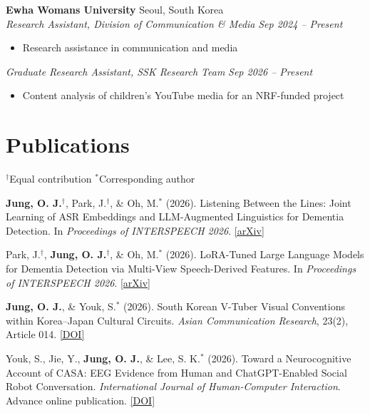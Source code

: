 \documentclass[11pt,a4paper]{article}
\newcommand{\Needspace}[1]{\par\ifdim\dimexpr\pagegoal-\pagetotal\relax<#1\relax\newpage\fi}
\newcommand{\cvrole}[2]{%
    \noindent\textit{#1} \hfill \textit{#2}%
}
\newcommand{\cvresearch}[4]{%
    \Needspace{6\baselineskip}\noindent\textbf{#1} \hfill #2 \\[3pt]
    \cvrole{#3}{#4}%
}
\begin{document}
\cvresearch{Ewha Womans University}{Seoul, South Korea}{Research Assistant, Division of Communication \& Media}{Sep 2024 -- Present}
\begin{itemize}[leftmargin=*, itemsep=3pt, topsep=6pt]
    \item Research assistance in communication and media
\end{itemize}
\vspace{6pt}

\cvrole{Graduate Research Assistant, SSK Research Team}{Sep 2026 -- Present}
\begin{itemize}[leftmargin=*, itemsep=3pt, topsep=6pt]
    \item Content analysis of children's YouTube media for an NRF-funded project
\end{itemize}

\section{Publications}
{\small $^{\dagger}$Equal contribution \quad $^{*}$Corresponding author}

\begin{enumerate}[leftmargin=*, label={[\arabic*]}, itemsep=2pt]
    \item\label{pub:listening} \textbf{Jung, O. J.}$^{\dagger}$, Park, J.$^{\dagger}$, \& Oh, M.$^{*}$ (2026). Listening Between the Lines: Joint Learning of ASR Embeddings and LLM-Augmented Linguistics for Dementia Detection. In \textit{Proceedings of INTERSPEECH 2026}. \href{https://arxiv.org/abs/2606.30675}{[arXiv]}

    \item\label{pub:lora} Park, J.$^{\dagger}$, \textbf{Jung, O. J.}$^{\dagger}$, \& Oh, M.$^{*}$ (2026). LoRA-Tuned Large Language Models for Dementia Detection via Multi-View Speech-Derived Features. In \textit{Proceedings of INTERSPEECH 2026}. \href{https://arxiv.org/abs/2606.28445}{[arXiv]}

    \item\label{pub:vtuber} \textbf{Jung, O. J.}, \& Youk, S.$^{*}$ (2026). South Korean V-Tuber Visual Conventions within Korea--Japan Cultural Circuits. \textit{Asian Communication Research}, 23(2), Article 014. \href{https://doi.org/10.20879/acr.2026.23.014}{[DOI]}

    \item\label{pub:casa} Youk, S., Jie, Y., \textbf{Jung, O. J.}, \& Lee, S. K.$^{*}$ (2026). Toward a Neurocognitive Account of CASA: EEG Evidence from Human and ChatGPT-Enabled Social Robot Conversation. \textit{International Journal of Human-Computer Interaction}. Advance online publication. \href{https://doi.org/10.1080/10447318.2026.2762653}{[DOI]}
\end{enumerate}
\end{document}
